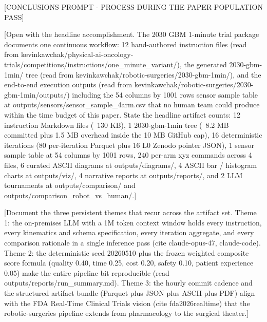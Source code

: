 
[CONCLUSIONS PROMPT - PROCESS DURING THE PAPER POPULATION PASS]

[Open with the headline accomplishment. The 2030 GBM 1-minute trial
package documents one continuous workflow: 12 hand-authored
instruction files (read from
kevinkawchak/physical-ai-oncology-trials/competitions/instructions/one_minute_variant/),
the generated 2030-gbm-1min/ tree (read from
kevinkawchak/robotic-surgeries/2030-gbm-1min/), and the end-to-end
execution outputs (read from
kevinkawchak/robotic-surgeries/2030-gbm-1min/outputs/) including the
54 columns by 1001 rows sensor sample table at
outputs/sensors/sensor_sample_4arm.csv that no human team could
produce within the time budget of this paper. State the headline
artifact counts: 12 instruction Markdown files (~130 KB), 1
2030-gbm-1min tree (~8.2 MB committed plus 1.5 MB overhead inside
the 10 MB GitHub cap), 16 deterministic iterations (80 per-iteration
Parquet plus 16 L0 Zenodo pointer JSON), 1 sensor sample table at
54 columns by 1001 rows, 240 per-arm xyz commands across 4 files, 6
curated ASCII diagrams at outputs/diagrams/, 4 ASCII bar / histogram
charts at outputs/viz/, 4 narrative reports at outputs/reports/, and
2 LLM tournaments at outputs/comparison/ and
outputs/comparison_robot_vs_human/.]

[Document the three persistent themes that recur across the
artifact set. Theme 1: the on-premises LLM with a 1M token context
window holds every instruction, every kinematics and schema
specification, every iteration aggregate, and every comparison
rationale in a single inference pass (cite claude-opus-47,
claude-code). Theme 2: the deterministic seed 20260510 plus the
frozen weighted composite score formula (quality 0.40, time 0.25,
cost 0.20, safety 0.10, patient experience 0.05) make the entire
pipeline bit reproducible (read outputs/reports/run_summary.md).
Theme 3: the hourly commit cadence and the structured artifact
bundle (Parquet plus JSON plus ASCII plus PDF) align with the FDA
Real-Time Clinical Trials vision (cite fda2026realtime) that the
robotic-surgeries pipeline extends from pharmacology to the surgical
theater.]

